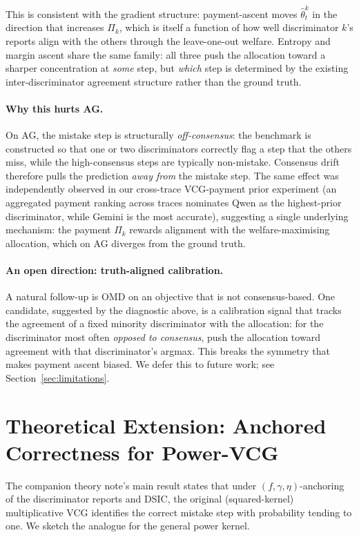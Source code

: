 \documentclass[11pt]{article}
\newcommand{\thetahat}{\hat{\theta}}
\begin{document}
This is consistent with the gradient structure: payment-ascent moves
$\thetahat^k_t$ in the direction that increases $\Pi_k$, which is itself a
function of how well discriminator $k$'s reports align with the others
through the leave-one-out welfare. Entropy and margin ascent share the
same family: all three push the allocation toward a sharper concentration
at \emph{some} step, but \emph{which} step is determined by the existing
inter-discriminator agreement structure rather than the ground truth.

\paragraph{Why this hurts AG.}
On AG, the mistake step is structurally \emph{off-consensus}: the
benchmark is constructed so that one or two discriminators correctly flag
a step that the others miss, while the high-consensus steps are typically
non-mistake. Consensus drift therefore pulls the prediction \emph{away
from} the mistake step. The same effect was independently observed in our
cross-trace VCG-payment prior experiment (an aggregated payment ranking
across traces nominates Qwen as the highest-prior discriminator, while
Gemini is the most accurate), suggesting a single underlying mechanism:
the payment $\Pi_k$ rewards alignment with the welfare-maximising
allocation, which on AG diverges from the ground truth.

\paragraph{An open direction: truth-aligned calibration.}
A natural follow-up is OMD on an objective that is not consensus-based.
One candidate, suggested by the diagnostic above, is a calibration signal
that tracks the agreement of a fixed minority discriminator with the
allocation: for the discriminator most often \emph{opposed to consensus},
push the allocation toward agreement with that discriminator's argmax.
This breaks the symmetry that makes payment ascent biased. We defer this
to future work; see Section~\ref{sec:limitations}.

\section{Theoretical Extension: Anchored Correctness for Power-VCG}

The companion theory note's main result states that under
$(f, \gamma, \eta)$-anchoring of the discriminator reports and DSIC,
the original (squared-kernel) multiplicative VCG identifies the correct
mistake step with probability tending to one. We sketch the analogue for
the general power kernel.
\end{document}
